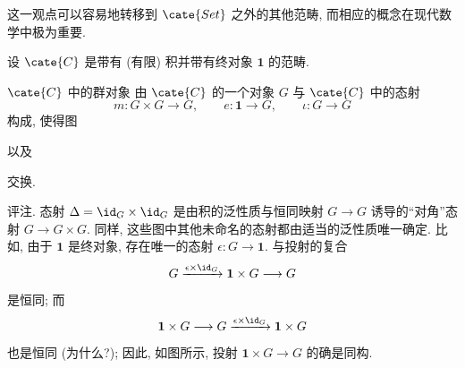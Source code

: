 这一观点可以容易地转移到 $\cate{Set}$ 之外的其他范畴, 而相应的概念在现代数学中极为重要.

\begin{definition}
\label{def:group-object}
设 $\cate{C}$ 是带有 (有限) 积并带有终对象 $\mathbf{1}$ 的范畴.

$\cate{C}$ 中的群对象%
由 $\cate{C}$ 的一个对象 $G$ 与 $\cate{C}$ 中的态射
\[
m : G \times G \to G, \qquad e : \mathbf{1} \to G, \qquad \iota : G \to G
\]
构成, 使得图
\begin{center}
\end{center}
\begin{center}
\qquad
{}
\end{center}
以及
\begin{center}
\qquad
{}
\end{center}
交换.
\end{definition}

评注. 态射 $\Delta = \id_G \times \id_G$ 是由积的泛性质与恒同映射 $G \to G$ 诱导的``对角''态射 $G \to G \times G$. 同样, 这些图中其他未命名的态射都由适当的泛性质唯一确定. 比如, 由于 $\mathbf{1}$ 是终对象, 存在唯一的态射 $\epsilon : G \to \mathbf{1}$. 与投射的复合
\[
G \xrightarrow{\epsilon \times \id_G} \mathbf{1} \times G \longrightarrow G
\]
是恒同; 而
\[
\mathbf{1} \times G \longrightarrow G \xrightarrow{\epsilon \times \id_G} \mathbf{1} \times G
\]
也是恒同 (为什么?); 因此, 如图所示, 投射 $\mathbf{1} \times G \to G$ 的确是同构.


